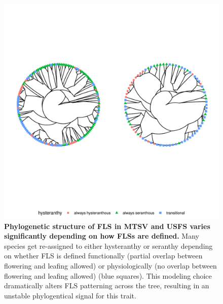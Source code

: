 \documentclass[12pt]{article}\usepackage[]{graphicx}\usepackage[]{color}
\begin{document}
\begin{figure}[H]

\includegraphics[width=7.5in]{figure/Code_chunk_Minimal_example3-1} 

   
  \caption{\textbf{Phylogenetic structure of FLS in MTSV and USFS varies significantly depending on how FLSs are defined.} Many species get re-assigned to either hysteranthy or seranthy depending on whether FLS is defined functionally (partial overlap between flowering and leafing allowed) or physiologically (no overlap between flowering and leafing allowed) (blue squares). This modeling choice dramatically alters FLS patterning across the tree, resulting in an unstable phylogentical signal for this trait.}
    \label{fig:Figure S1}
    \end{figure}
  
  
\pagebreak

\end{document}
